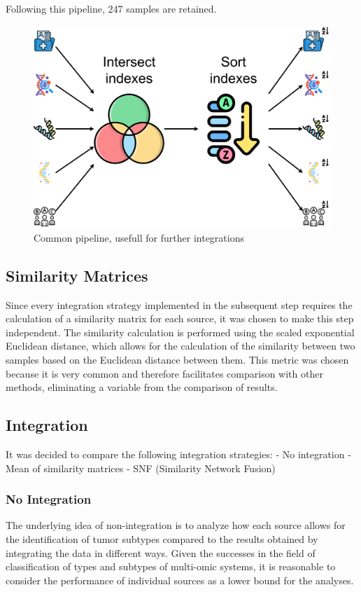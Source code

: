 \documentclass[12pt,a4paper]{article}
\begin{document}
Following this pipeline, 247 samples are retained.

\begin{figure}[htbp!]
\begin{center}
\includegraphics[width=0.9\columnwidth]{./static/multidataframes_pipeline.png}
\end{center}
\caption{Common pipeline, usefull for further integrations}
\label{fig:multidataframes_pipeline}
\end{figure}

\subsection{Similarity Matrices}
Since every integration strategy implemented in the subsequent step requires the calculation of a similarity matrix for each source, it was chosen to make this step independent.
The similarity calculation is performed using the scaled exponential Euclidean distance, which allows for the calculation of the similarity between two samples based on the Euclidean distance between them. This metric was chosen because it is very common and therefore facilitates comparison with other methods, eliminating a variable from the comparison of results.

\subsection{Integration}
It was decided to compare the following integration strategies:
- No integration
- Mean of similarity matrices
- SNF (Similarity Network Fusion)

\subsubsection{No Integration}
The underlying idea of non-integration is to analyze how each source allows for the identification of tumor subtypes compared to the results obtained by integrating the data in different ways. Given the successes in the field of classification of types and subtypes of multi-omic systems, it is reasonable to consider the performance of individual sources as a lower bound for the analyses.
\end{document}
